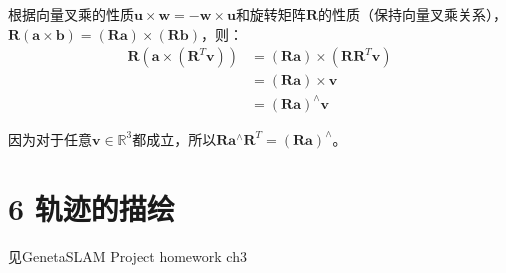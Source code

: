 \documentclass[12pt, a4paper, oneside]{ctexart}
\begin{document}
	根据向量叉乘的性质\(\boldsymbol{u}\times\boldsymbol{w} = -\boldsymbol{w}\times\boldsymbol{u}\)和旋转矩阵\(\boldsymbol{R}\)的性质（保持向量叉乘关系），\(\boldsymbol{R}(\boldsymbol{a}\times\boldsymbol{b})=(\boldsymbol{R}\boldsymbol{a})\times(\boldsymbol{R}\boldsymbol{b})\)，则：
	\begin{align}
		\boldsymbol{R}(\boldsymbol{a}\times(\boldsymbol{R}^T\boldsymbol{v}))&= (\boldsymbol{R}\boldsymbol{a})\times(\boldsymbol{R}\boldsymbol{R}^T\boldsymbol{v})\\
		&=(\boldsymbol{R}\boldsymbol{a})\times\boldsymbol{v}\\
		&= (\boldsymbol{R}\boldsymbol{a})^{\wedge}\boldsymbol{v}
	\end{align}
	
	因为对于任意\(\boldsymbol{v}\in\mathbb{R}^3\)都成立，所以\(\boldsymbol{R}\boldsymbol{a}^{\wedge}\boldsymbol{R}^T = (\boldsymbol{R}\boldsymbol{a})^{\wedge}\)。
	
	\section{6 轨迹的描绘}
	
	见GenetaSLAM Project homework ch3
	
\end{document}
